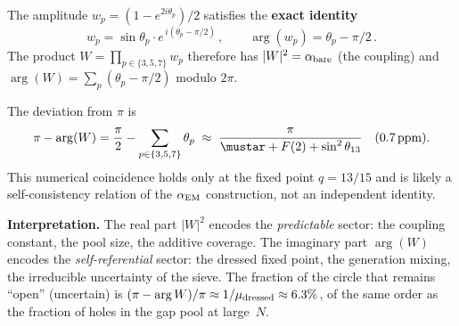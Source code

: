 \documentclass[12pt,a4paper]{article}
\begin{document}
\begin{remark}
\label{rem:complex_phase}
The amplitude $w_p = (1 - e^{2i\theta_p})/2$ satisfies the
\textbf{exact identity}
\begin{equation}
  w_p = \sin\theta_p \cdot e^{\,i(\theta_p - \pi/2)}\,,
  \qquad
  \arg(w_p) = \theta_p - \pi/2\,.
  \label{eq:arg_wp}
\end{equation}
The product $W = \prod_{p \in \{3,5,7\}} w_p$ therefore has
$|W|^2 = \alpha_{\rm bare}$ (the coupling) and
$\arg(W) = \sum_p (\theta_p - \pi/2)$ modulo $2\pi$.

The deviation from $\pi$ is
\begin{equation}
  \pi - \arg(W) = \frac{\pi}{2} - \sum_{p \in \{3,5,7\}} \theta_p
  \;\approx\; \frac{\pi}{\mustar + F(2) + \sin^2\theta_{13}}
  \quad (0.7\,\mathrm{ppm}).
  \label{eq:phase_deviation}
\end{equation}
This numerical coincidence holds only at the fixed point
$q = 13/15$ and is likely a self-consistency relation of the
$\alpha_{\rm EM}$ construction, not an independent identity.

\textbf{Interpretation.}
The real part $|W|^2$ encodes the \emph{predictable} sector:
the coupling constant, the pool size, the additive coverage.
The imaginary part $\arg(W)$ encodes the \emph{self-referential}
sector: the dressed fixed point, the generation mixing, the
irreducible uncertainty of the sieve.  The fraction of the circle
that remains ``open'' (uncertain) is
$(\pi - \arg W)/\pi \approx 1/\mu_{\rm dressed} \approx 6.3\%$,
of the same order as the fraction of holes in the gap pool
at large~$N$.
\end{remark}
\end{document}
